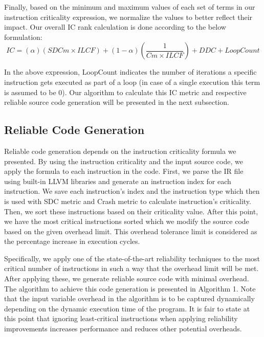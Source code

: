 Finally, based on the minimum and maximum values of each set of terms in our instruction criticality expression, we normalize the values to better reflect their impact. Our overall IC rank calculation is done according to the below formulation:
\begin{equation}
IC =(\alpha)(SDCm \times ILCF) + (1-\alpha)(\frac{1}{Cm \times ILCF})
+DDC+Loop Count 
\end{equation}

 In the above expression, LoopCount indicates the number of iterations a specific instruction gets executed as part of a loop (in case of a single execution this term is assumed to be 0). Our algorithm to calculate this IC metric and respective reliable source code generation will be presented in the next subsection. 



\subsection{Reliable Code Generation}

Reliable code generation depends on the instruction criticality formula we presented. By using the instruction criticality and the input source code, we apply the formula to each instruction in the code. First, we parse the IR file using built-in LLVM \cite{LLVM:2004} libraries and generate an instruction index for each instruction. We save each instruction's index and the instruction type which then is used with SDC metric and Crash metric to calculate instruction's criticality. Then, we sort these instructions based on their criticality value. After this point, we have the most critical instructions sorted which we modify the source code based on the given overhead limit. This overhead tolerance limit is considered as the percentage increase in execution cycles.

Specifically, we apply one of the state-of-the-art reliability techniques to the most critical number of instructions in such a way that the overhead limit will be met. After applying these, we generate reliable source code with minimal overhead. The algorithm to achieve this code generation is presented in Algorithm 1. Note that the input variable overhead in the algorithm is to be captured dynamically depending on the dynamic execution time of the program. It is fair to state at this point that ignoring least-critical instructions when applying reliability improvements increases performance and reduces other potential overheads.

